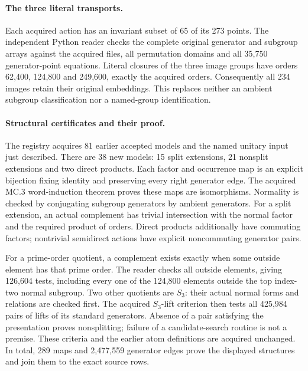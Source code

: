 \documentclass[11pt]{article}
\begin{document}
\newpage
\paragraph{The three literal transports.}
Each acquired action has an invariant subset of 65 of its 273 points.
The independent Python reader checks the complete original generator and
subgroup arrays against the acquired files, all permutation domains and
all 35,750 generator-point equations. Literal closures of the three image
groups have orders 62,400, 124,800 and 249,600, exactly the acquired orders.
Consequently all 234 images retain their original embeddings. This replaces
neither an ambient subgroup classification nor a named-group identification.

\paragraph{Structural certificates and their proof.}
The registry acquires 81 earlier accepted models and the named unitary
input just described. There are 38 new models: 15 split extensions, 21
nonsplit extensions and two direct products. Each factor and occurrence
map is an explicit bijection fixing identity and preserving every right
generator edge. The acquired MC.3 word-induction theorem proves these maps
are isomorphisms. Normality is checked by conjugating subgroup generators
by ambient generators. For a split extension, an actual complement has
trivial intersection with the normal factor and the required product of
orders. Direct products additionally have commuting factors; nontrivial
semidirect actions have explicit noncommuting generator pairs.

For a prime-order quotient, a complement exists exactly when some outside
element has that prime order. The reader checks all outside elements,
giving 126,604 tests, including every one of the 124,800 elements outside
the top index-two normal subgroup. Two other quotients are $S_3$: their
actual normal forms and relations are checked first. The acquired
$S_3$-lift criterion then tests all 425,984 pairs of lifts of its standard
generators. Absence of a pair satisfying the presentation proves nonsplitting;
failure of a candidate-search routine is not a premise. These criteria and
the earlier atom definitions are acquired unchanged. In total, 289 maps
and 2,477,559 generator edges prove the displayed structures and join them
to the exact source rows.
\end{document}
